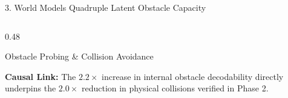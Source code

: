 \documentclass[aspectratio=169, 10pt]{beamer}
\begin{document}
\begin{frame}{3. World Models Quadruple Latent Obstacle Capacity}
\begin{columns}[T]
\begin{column}{0.48\textwidth}
\begin{block}{Obstacle Probing \& Collision Avoidance}
      \end{block}
      \scriptsize \textbf{Causal Link:} The $2.2\times$ increase in internal obstacle decodability directly underpins the $2.0\times$ reduction in physical collisions verified in Phase 2.
    \end{column}
  \end{columns}
\end{frame}

\end{document}
